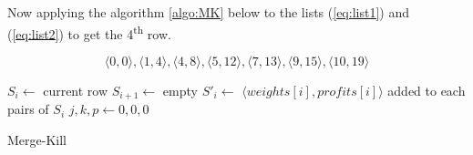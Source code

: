 Now applying the algorithm \ref{algo:MK} below to the lists (\ref{eq:list1}) and (\ref{eq:list2}) to get the 4\textsuperscript{th} row. 

\begin{equation}
\label{eq:list3}
\langle 0, 0\rangle, \langle 1, 4\rangle, \langle 4, 8\rangle, \langle 5,
              12\rangle, \langle 7, 13\rangle, \langle 9, 15\rangle,
              \langle 10, 19\rangle
\end{equation}

\begin{algorithm}

\SetAlgoLined
{}
 $S_{i} \leftarrow $ current row\; 
 $S_{i+1} \leftarrow $ empty\;
 $S'_{i} \leftarrow $ $\langle weights[i], profits[i] \rangle$ added to each pairs of $S_i$\;
 $j,k,p \leftarrow 0,0,0$\;
 \caption{Merge-Kill \label{algo:MK}}
\end{algorithm}




